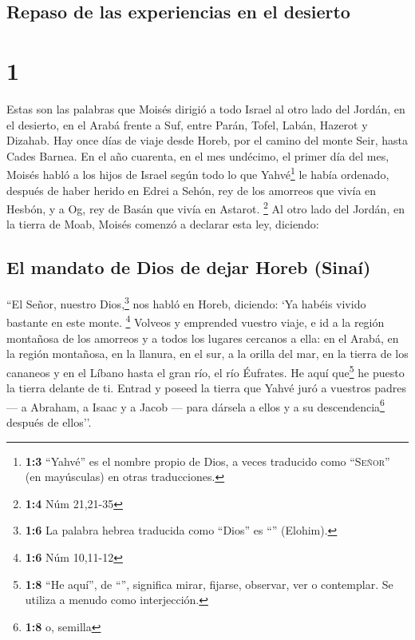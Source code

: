\hypertarget{repaso-de-las-experiencias-en-el-desierto}{%
\subsection{Repaso de las experiencias en el
desierto}\label{repaso-de-las-experiencias-en-el-desierto}}

\hypertarget{section}{%
\section{1}\label{section}}

 Estas son las palabras que Moisés dirigió a todo Israel
al otro lado del Jordán, en el desierto, en el Arabá frente a Suf, entre
Parán, Tofel, Labán, Hazerot y Dizahab.  Hay once días de
viaje desde Horeb, por el camino del monte Seir, hasta Cades Barnea.
 En el año cuarenta, en el mes undécimo, el primer día del
mes, Moisés habló a los hijos de Israel según todo lo que
Yahvé\footnote{\textbf{1:3} ``Yahvé'' es el nombre propio de Dios, a
  veces traducido como ``\textsc{Señor}'' (en mayúsculas) en otras
  traducciones.} le había ordenado,  después de haber
herido en Edrei a Sehón, rey de los amorreos que vivía en Hesbón, y a
Og, rey de Basán que vivía en Astarot. \footnote{\textbf{1:4} Núm
  21,21-35}  Al otro lado del Jordán, en la tierra de
Moab, Moisés comenzó a declarar esta ley, diciendo:

\hypertarget{el-mandato-de-dios-de-dejar-horeb-sinauxed}{%
\subsection{El mandato de Dios de dejar Horeb
(Sinaí)}\label{el-mandato-de-dios-de-dejar-horeb-sinauxed}}

 ``El Señor, nuestro Dios,\footnote{\textbf{1:6} La
  palabra hebrea traducida como ``Dios'' es ``'' (Elohim).}
nos habló en Horeb, diciendo: `Ya habéis vivido bastante en este monte.
\footnote{\textbf{1:6} Núm 10,11-12}  Volveos y emprended
vuestro viaje, e id a la región montañosa de los amorreos y a todos los
lugares cercanos a ella: en el Arabá, en la región montañosa, en la
llanura, en el sur, a la orilla del mar, en la tierra de los cananeos y
en el Líbano hasta el gran río, el río Éufrates.  He aquí
que\footnote{\textbf{1:8} ``He aquí'', de ``'', significa
  mirar, fijarse, observar, ver o contemplar. Se utiliza a menudo como
  interjección.} he puesto la tierra delante de ti. Entrad y poseed la
tierra que Yahvé juró a vuestros padres --- a Abraham, a Isaac y a Jacob
--- para dársela a ellos y a su descendencia\footnote{\textbf{1:8} o,
  semilla} después de ellos''.


